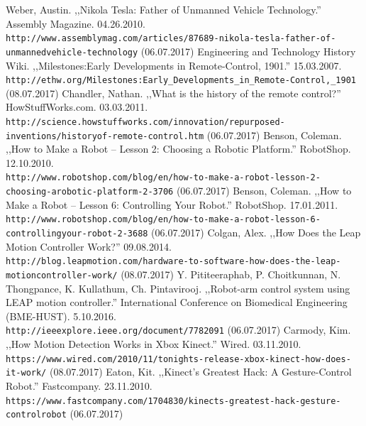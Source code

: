 \documentclass[12pt,a4paper]{report}
\begin{document}
\renewcommand\bibname{Literatura}
\begin{thebibliography}{99}
Weber, Austin. ,,Nikola Tesla: Father of Unmanned Vehicle Technology.'' Assembly Magazine. 04.26.2010.
\\\texttt{http://www.assemblymag.com/articles/87689-nikola-tesla-father-of-unmanned\-vehicle-technology}
(06.07.2017)
Engineering and Technology History Wiki. ,,Milestones:Early Developments in Remote-Control, 1901.'' 15.03.2007.
\\\texttt{http://ethw.org/Milestones:Early\_Developments\_in\_Remote-Control,\_1901} (08.07.2017)
Chandler, Nathan. ,,What is the history of the remote control?'' HowStuffWorks.com. 03.03.2011.
\\\texttt{http://science.howstuffworks.com/innovation/repurposed-inventions/history\-of-remote-control.htm}
(06.07.2017)
Benson, Coleman. ,,How to Make a Robot – Lesson 2: Choosing a Robotic Platform.'' RobotShop. 12.10.2010.
\\\texttt{http://www.robotshop.com/blog/en/how-to-make-a-robot-lesson-2-choosing-a\-robotic-platform-2-3706}
(06.07.2017)
Benson, Coleman. ,,How to Make a Robot – Lesson 6: Controlling Your Robot.'' RobotShop. 17.01.2011.
\\\texttt{http://www.robotshop.com/blog/en/how-to-make-a-robot-lesson-6-controlling\-your-robot-2-3688}
(06.07.2017)
Colgan, Alex. ,,How Does the Leap Motion Controller Work?'' 09.08.2014.
\\\texttt{http://blog.leapmotion.com/hardware-to-software-how-does-the-leap-motion\-controller-work/} (08.07.2017)
Y. Pititeeraphab, P. Choitkunnan, N. Thongpance, K. Kullathum, Ch. Pintavirooj. ,,Robot-arm control system using LEAP motion controller.''  International Conference on Biomedical Engineering (BME-HUST). 5.10.2016.
\\\texttt{http://ieeexplore.ieee.org/document/7782091}
(06.07.2017)
Carmody, Kim. ,,How Motion Detection Works in Xbox Kinect.'' Wired. 03.11.2010.
\\\texttt{https://www.wired.com/2010/11/tonights-release-xbox-kinect-how-does-it-work/}
(08.07.2017)
Eaton, Kit. ,,Kinect’s Greatest Hack: A Gesture-Control Robot.'' Fastcompany. 23.11.2010.
\\\texttt{https://www.fastcompany.com/1704830/kinects-greatest-hack-gesture-control\-robot} (06.07.2017)

\end{thebibliography}
\end{document}
